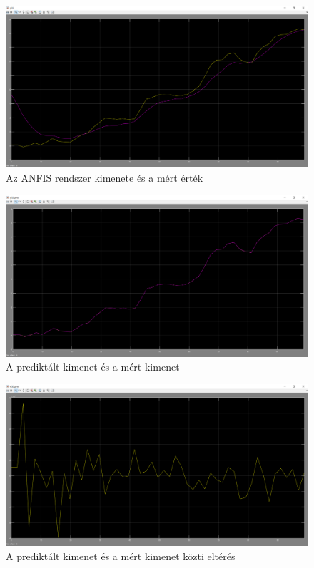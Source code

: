 \begin{figure}[!h]
	\centering
	\includegraphics[width=150mm, keepaspectratio]{figures/m05/4_1.png}
	\caption{Az ANFIS rendszer kimenete és a mért érték}
\end{figure}
\begin{figure}[!h]
	\centering
	\includegraphics[trim=0mm 0mm 0mm 10mm, clip, width=150mm, keepaspectratio]{figures/m05/4_2.png}
	\caption{A prediktált kimenet és a mért kimenet}
\end{figure}
\begin{figure}[!h]
	\centering
	\includegraphics[trim=0mm 0mm 0mm 10mm, clip, width=150mm, keepaspectratio]{figures/m05/4_3.png}
	\caption{A prediktált kimenet és a mért kimenet közti eltérés}
\end{figure}

